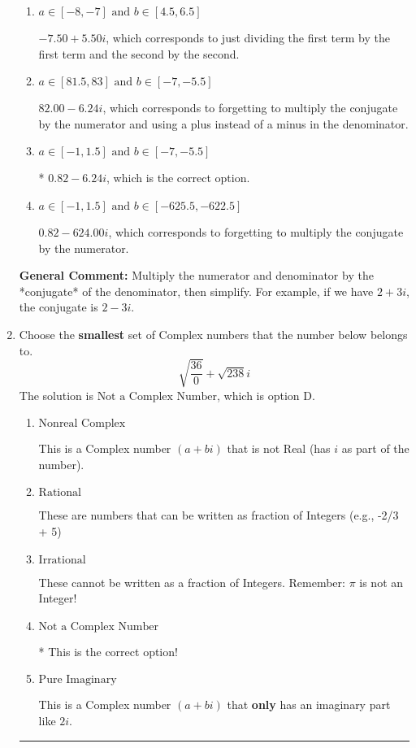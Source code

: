 \documentclass{extbook}[14pt]
\newcommand{\litem}[1]{\item #1

\rule{\textwidth}{0.4pt}}
\begin{document}
\begin{enumerate}
{\begin{enumerate}[label=\Alph*.]
 $-6.22  + 0.96 i$, which corresponds to forgetting to multiply the conjugate by the numerator and not computing the conjugate correctly.
\item \( a \in [-8, -7] \text{ and } b \in [4.5, 6.5] \)

 $-7.50  + 5.50 i$, which corresponds to just dividing the first term by the first term and the second by the second.
\item \( a \in [81.5, 83] \text{ and } b \in [-7, -5.5] \)

 $82.00  - 6.24 i$, which corresponds to forgetting to multiply the conjugate by the numerator and using a plus instead of a minus in the denominator.
\item \( a \in [-1, 1.5] \text{ and } b \in [-7, -5.5] \)

* $0.82  - 6.24 i$, which is the correct option.
\item \( a \in [-1, 1.5] \text{ and } b \in [-625.5, -622.5] \)

 $0.82  - 624.00 i$, which corresponds to forgetting to multiply the conjugate by the numerator.
\end{enumerate}

\textbf{General Comment:} Multiply the numerator and denominator by the *conjugate* of the denominator, then simplify. For example, if we have $2+3i$, the conjugate is $2-3i$.
}
\litem{
Choose the \textbf{smallest} set of Complex numbers that the number below belongs to.
\[ \sqrt{\frac{36}{0}}+\sqrt{238} i \]The solution is \( \text{Not a Complex Number} \), which is option D.\begin{enumerate}[label=\Alph*.]
\item \( \text{Nonreal Complex} \)

This is a Complex number $(a+bi)$ that is not Real (has $i$ as part of the number).
\item \( \text{Rational} \)

These are numbers that can be written as fraction of Integers (e.g., -2/3 + 5)
\item \( \text{Irrational} \)

These cannot be written as a fraction of Integers. Remember: $\pi$ is not an Integer!
\item \( \text{Not a Complex Number} \)

* This is the correct option!
\item \( \text{Pure Imaginary} \)

This is a Complex number $(a+bi)$ that \textbf{only} has an imaginary part like $2i$.
\end{enumerate}

}
\end{enumerate}
\end{document}

